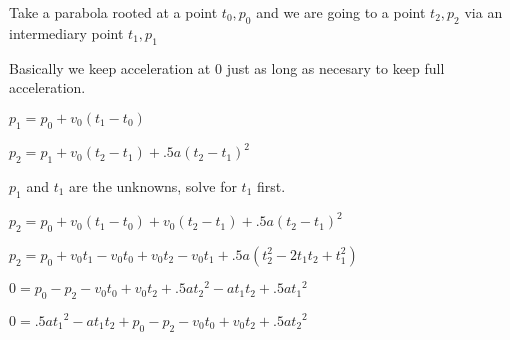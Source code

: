 \documentclass{article}
\begin{document}
Take a parabola rooted at a point $t_0, p_0$ and we
are going to a point $t_2, p_2$ via an intermediary point $t_1,p_1$

Basically we keep acceleration at 0 just as long as necesary to keep full
acceleration.

$p_1 = p_0 + v_0 (t_1 - t_0)$

$p_2 = p_1 + v_0 (t_2 - t_1) + .5a(t_2-t_1)^2$

$p_1$ and $t_1$ are the unknowns, solve for $t_1$ first.

$p_2 = p_0 + v_0 (t_1 - t_0) + v_0 (t_2 - t_1) + .5a(t_2-t_1)^2$

$p_2 = p_0 + v_0t_1 - v_0t_0 + v_0t_2 - v_0t_1 + .5a(t_2^2-2t_1t_2+t_1^2)$

$0 = p_0 - p_2 - v_0t_0 + v_0t_2 + .5a{t_2}^2-at_1t_2+.5{at_1}^2$

$0 = .5{at_1}^2  -at_1t_2 + p_0 - p_2 - v_0t_0 + v_0t_2 + .5a{t_2}^2$



  
\end{document}
